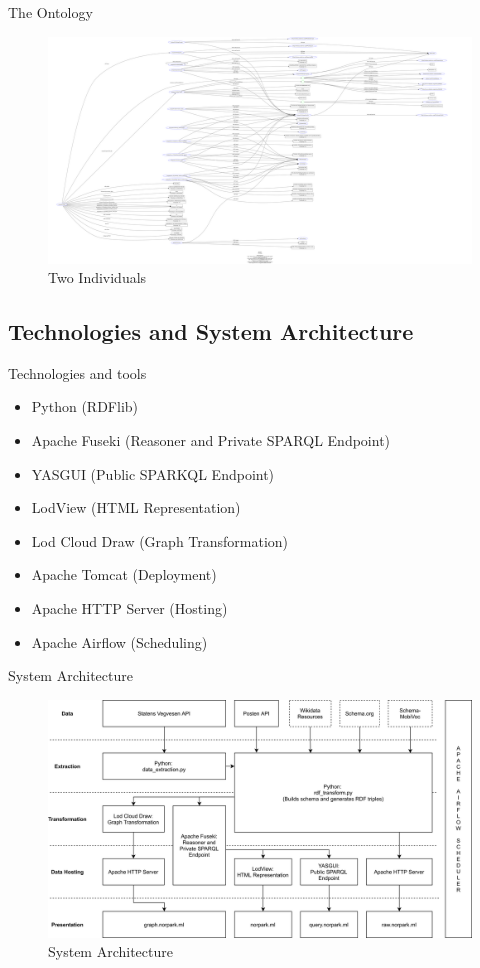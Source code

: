 \documentclass{beamer}
\begin{document}
	\begin{frame}{The Ontology}
		\begin{figure}
			\includegraphics[scale=0.04]{resources/graph.png}
			\caption{Two Individuals}
		\end{figure}
	\end{frame}
	\subsection{Technologies and System Architecture}
		\begin{frame}{Technologies and tools}
			\begin{itemize}
				\item Python (RDFlib)
				\item Apache Fuseki (Reasoner and Private SPARQL Endpoint)
				\item YASGUI (Public SPARKQL Endpoint)
				\item LodView (HTML Representation)
				\item Lod Cloud Draw (Graph Transformation)
				\item Apache Tomcat (Deployment)
				\item Apache HTTP Server (Hosting)
				\item Apache Airflow (Scheduling)
			\end{itemize}
		\end{frame}
	\begin{frame}{System Architecture}
		\begin{figure}
			\includegraphics[scale=0.075]{resources/system-architecture.png}
			\caption{System Architecture}
		\end{figure}
	\end{frame}
\end{document}
